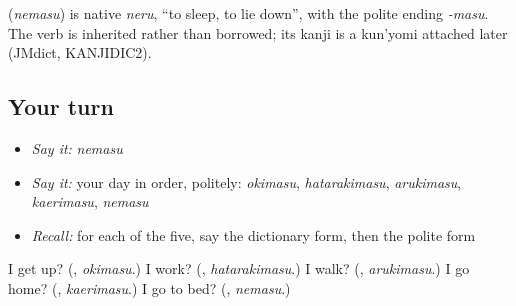 \begin{cousinweb}
\textbf{} (\emph{nemasu}) is native \emph{neru}, \textquotedblleft{}to sleep, to lie down\textquotedblright{}, with the polite ending \emph{-masu}. The verb is inherited rather than borrowed; its kanji is a kun'yomi attached later (JMdict, KANJIDIC2).
\end{cousinweb}

\subsection*{Your turn}
\begin{itemize}
\raggedright
  \item \emph{Say it:} \emph{nemasu}
  \item \emph{Say it:} your day in order, politely: \emph{okimasu}, \emph{hatarakimasu}, \emph{arukimasu}, \emph{kaerimasu}, \emph{nemasu}
  \item \emph{Recall:} for each of the five, say the dictionary form, then the polite form
\end{itemize}

\begin{tcolorbox}[breakable,colback=teal!4,colframe=teal!35!black,title={Before you move on}]
I get up? (\textbf{}, \emph{okimasu}.) I work? (\textbf{}, \emph{hatarakimasu}.) I walk? (\textbf{}, \emph{arukimasu}.) I go home? (\textbf{}, \emph{kaerimasu}.) I go to bed? (\textbf{}, \emph{nemasu}.)
\end{tcolorbox}
